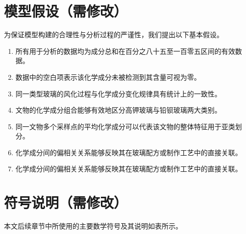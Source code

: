 \section{模型假设（需修改）}
为保证模型构建的合理性与分析过程的严谨性，我们提出以下基本假设。
\begin{enumerate}
	\item 所有用于分析的数据均为成分总和在百分之八十五至一百零五区间的有效数据。
	\item 数据中的空白项表示该化学成分未被检测到其含量可视为零。
	\item 同一类型玻璃的风化过程与化学成分变化规律具有统计上的一致性。
	\item 文物的化学成分组合能够有效地区分高钾玻璃与铅钡玻璃两大类别。
	\item 同一文物多个采样点的平均化学成分可以代表该文物的整体特征用于亚类划分。
	\item 化学成分间的偏相关关系能够反映其在玻璃配方或制作工艺中的直接关联。
	\item 化学成分间的偏相关关系能够反映其在玻璃配方或制作工艺中的直接关联。
\end{enumerate}

\section{符号说明（需修改）}
本文后续章节中所使用的主要数学符号及其说明如表所示。

